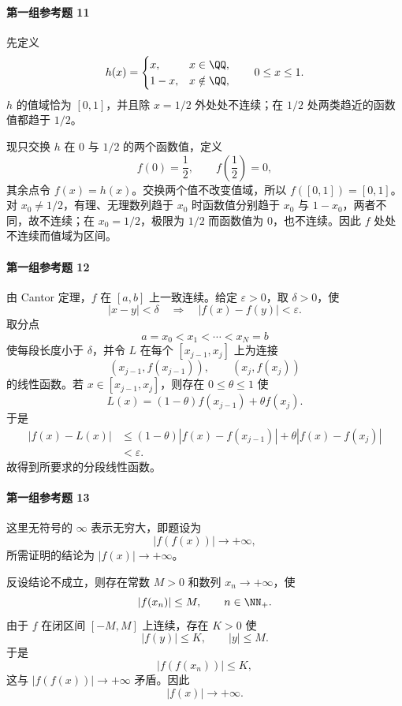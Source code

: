 \paragraph{第一组参考题 11}
\begin{xsolution}
先定义
\[
 h(x)=\begin{cases}
 x,&x\in\QQ,\\
 1-x,&x\notin\QQ,
 \end{cases}
 \qquad 0\le x\le1.
\]
$h$ 的值域恰为 $[0,1]$，并且除 $x=1/2$ 外处处不连续；在 $1/2$ 处两类趋近的函数值都趋于 $1/2$。

现只交换 $h$ 在 $0$ 与 $1/2$ 的两个函数值，定义
\[
 f(0)=\frac12,
 \qquad f\left(\frac12\right)=0,
\]
其余点令 $f(x)=h(x)$。交换两个值不改变值域，所以 $f([0,1])=[0,1]$。对 $x_0\ne1/2$，有理、无理数列趋于 $x_0$ 时函数值分别趋于 $x_0$ 与 $1-x_0$，两者不同，故不连续；在 $x_0=1/2$，极限为 $1/2$ 而函数值为 $0$，也不连续。因此 $f$ 处处不连续而值域为区间。
\end{xsolution}

\paragraph{第一组参考题 12}
\begin{xsolution}
由 Cantor 定理，$f$ 在 $[a,b]$ 上一致连续。给定 $\varepsilon>0$，取 $\delta>0$，使
\[
 |x-y|<\delta
 \quad\Longrightarrow\quad
 |f(x)-f(y)|<\varepsilon.
\]
取分点
\[
 a=x_0<x_1<\cdots<x_N=b
\]
使每段长度小于 $\delta$，并令 $L$ 在每个 $[x_{j-1},x_j]$ 上为连接
\[
 (x_{j-1},f(x_{j-1})),\qquad (x_j,f(x_j))
\]
的线性函数。若 $x\in[x_{j-1},x_j]$，则存在 $0\le\theta\le1$ 使
\[
 L(x)=(1-\theta)f(x_{j-1})+\theta f(x_j).
\]
于是
\[
 \begin{aligned}
 |f(x)-L(x)|
 &\le(1-\theta)|f(x)-f(x_{j-1})|
   +\theta|f(x)-f(x_j)|\\
 &<\varepsilon.
 \end{aligned}
\]
故得到所要求的分段线性函数。
\end{xsolution}

\paragraph{第一组参考题 13}
\begin{xsolution}
这里无符号的 $\infty$ 表示无穷大，即题设为
\[
 |f(f(x))|\to+\infty,
\]
所需证明的结论为 $|f(x)|\to+\infty$。

反设结论不成立，则存在常数 $M>0$ 和数列 $x_n\to+\infty$，使
\[
 |f(x_n)|\le M,
 \qquad n\in\NN_+.
\]
由于 $f$ 在闭区间 $[-M,M]$ 上连续，存在 $K>0$ 使
\[
 |f(y)|\le K,
 \qquad |y|\le M.
\]
于是
\[
 |f(f(x_n))|\le K,
\]
这与 $|f(f(x))|\to+\infty$ 矛盾。因此
\[
 |f(x)|\to+\infty.
\]
\end{xsolution}

